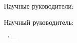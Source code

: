 %
\vspace{0pt plus4fill} %
\begin{flushright}
\ifdefined\supervisorTwoFio
Научные руководители:

\supervisorRegalia

\ifdefined\supervisorDead
\framebox{\supervisorFio}
\else
\supervisorFio
\fi

\supervisorTwoRegalia

\ifdefined\supervisorTwoDead
\framebox{\supervisorTwoFio}
\else
\supervisorFio
\fi
\else
Научный руководитель:

\supervisorRegalia

\ifdefined\supervisorDead
\framebox{\supervisorFio}
\else
\supervisorFio
\fi
\fi

\end{flushright}
%
\vspace{0pt plus4fill} %
{\centering\thesisCity\ "--- \thesisYear\par}
